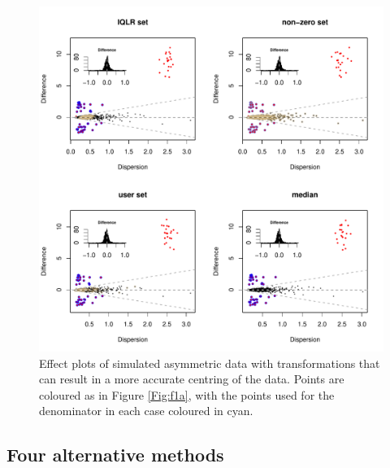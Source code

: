 \documentclass[10pt]{article}
\begin{document}
\begin{figure}[!ht]
\includegraphics[width=6in]{Fig_2.pdf}
\vspace{3mm} \caption{Effect plots of simulated asymmetric data with transformations that can result in a more accurate centring of the data. Points are coloured as in Figure \ref{Fig:f1a}, with the points used for the denominator in each case coloured in cyan.}
\label{Fig:f2a}
\end{figure}



\subsection{Four alternative methods}
\vskip-0.25cm
\end{document}
